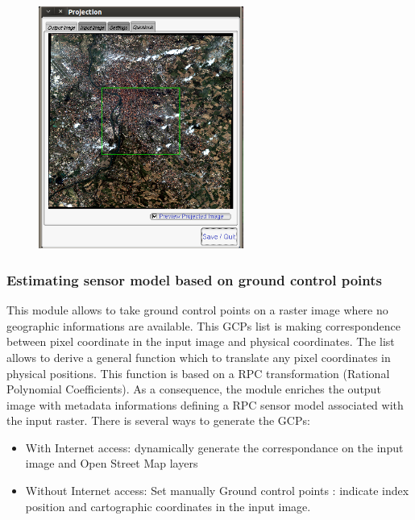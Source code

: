 \begin{figure}
  \center
  \includegraphics[width=0.6\textwidth]{../Art/MonteverdiImages/monteverdi_ortho_extent.png}
  \label{fig:ortho}
\end{figure}


\subsubsection{Estimating sensor model based on ground control points}
This module allows to take ground control points on a raster image
where no geographic informations are available.  This GCPs list is
making correspondence between pixel coordinate in the input image and
physical coordinates. The list allows to derive a general function
which to translate any pixel coordinates in physical positions. This
function is based on a RPC transformation (Rational Polynomial
Coefficients). As a consequence, the module enriches the output image
with metadata informations defining a RPC sensor model associated with
the input raster.  There is several ways to generate the GCPs:

\begin{itemize}
\item With Internet access: dynamically generate the correspondance on
  the input image and Open Street Map layers
\item Without Internet access: Set manually Ground control points :
  indicate index position and cartographic coordinates in the input
  image.
\end{itemize}

